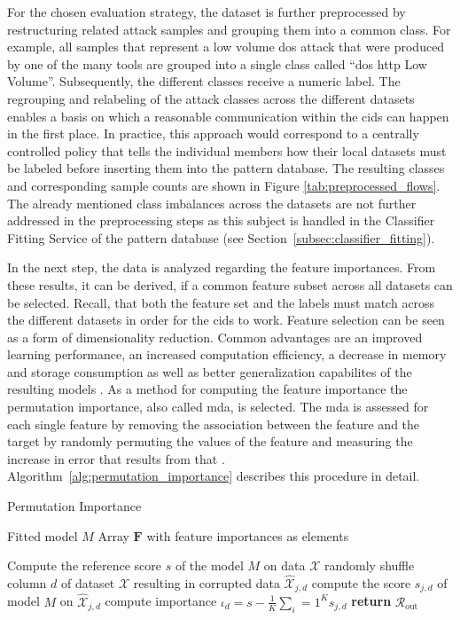 \documentclass[../../main.tex]{subfiles}
\begin{document}
For the chosen evaluation strategy, the dataset is further preprocessed by restructuring related attack samples and grouping them into a common class. For example, all samples that represent a low volume \gls{dos} attack that were produced by one of the many tools are grouped into a single class called ``\gls{dos} \gls{http} Low Volume''. Subsequently, the different classes receive a numeric label. The regrouping and relabeling of the attack classes across the different datasets enables a basis on which a reasonable communication within the \gls{cids} can happen in the first place. In practice, this approach would correspond to a centrally controlled policy that tells the individual members how their local datasets must be labeled before inserting them into the pattern database. The resulting classes and corresponding sample counts are shown in Figure \ref{tab:preprocessed_flows}. The already mentioned class imbalances across the datasets are not further addressed in the preprocessing steps as this subject is handled in the Classifier Fitting Service of the pattern database (see Section~\ref{subsec:classifier_fitting}).

In the next step, the data is analyzed regarding the feature importances. From these results, it can be derived, if a common feature subset across all datasets can be selected. Recall, that both the feature set and the labels must match across the different datasets in order for the \gls{cids} to work. Feature selection can be seen as a form of dimensionality reduction. Common advantages are an improved learning performance, an increased computation efficiency, a decrease in memory and storage consumption as well as better generalization capabilites of the resulting models \cite{li2017feature}. As a method for computing the feature importance the permutation importance, also called \gls{mda}, is selected. The \gls{mda} is assessed for each single feature by removing the association between the feature and the target by randomly permuting the values of the feature and measuring the increase in error that results from that \cite[125]{rforests_2014}. Algorithm~\ref{alg:permutation_importance} describes this procedure in detail.

\begin{algorithm}
    \caption{Permutation Importance}
    \label{alg:permutation_importance}
    \begin{algorithmic}[1]
        \REQUIRE Fitted model $M$
        \ENSURE Array $\bm{F}$ with feature importances as elements

        \STATE Compute the reference score $s$ of the model $M$ on data $\mathcal{X}$
                \STATE randomly shuffle column $d$ of dataset $\mathcal{X}$ resulting in corrupted data $\hat{\mathcal{X}}_{j,d}$
                \STATE compute the score $s_{j,d}$ of model $M$ on $\hat{\mathcal{X}}_{j,d}$
            \ENDFOR
            \STATE compute importance $\iota_d = s - \frac{1}{K} \sum_i=1^K s_{j,d}$
        \ENDFOR
        \STATE \textbf{return} $\mathcal{R}_{\text{out}}$
    \end{algorithmic}
 \end{algorithm}
\end{document}
